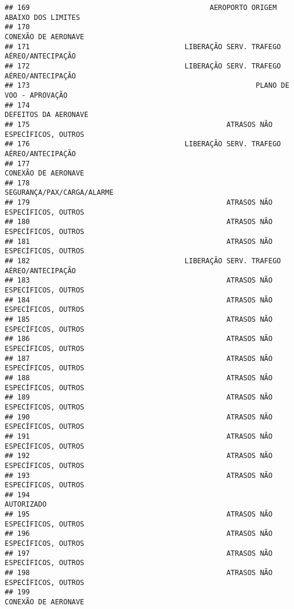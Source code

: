 \documentclass[
]{article}
\begin{document}
\begin{verbatim}
## 169                                           AEROPORTO ORIGEM ABAIXO DOS LIMITES
## 170                                                           CONEXÃO DE AERONAVE
## 171                                     LIBERAÇÃO SERV. TRAFEGO AÉREO/ANTECIPAÇÃO
## 172                                     LIBERAÇÃO SERV. TRAFEGO AÉREO/ANTECIPAÇÃO
## 173                                                      PLANO DE VOO - APROVAÇÃO
## 174                                                          DEFEITOS DA AERONAVE
## 175                                               ATRASOS NÃO ESPECÍFICOS, OUTROS
## 176                                     LIBERAÇÃO SERV. TRAFEGO AÉREO/ANTECIPAÇÃO
## 177                                                           CONEXÃO DE AERONAVE
## 178                                                    SEGURANÇA/PAX/CARGA/ALARME
## 179                                               ATRASOS NÃO ESPECÍFICOS, OUTROS
## 180                                               ATRASOS NÃO ESPECÍFICOS, OUTROS
## 181                                               ATRASOS NÃO ESPECÍFICOS, OUTROS
## 182                                     LIBERAÇÃO SERV. TRAFEGO AÉREO/ANTECIPAÇÃO
## 183                                               ATRASOS NÃO ESPECÍFICOS, OUTROS
## 184                                               ATRASOS NÃO ESPECÍFICOS, OUTROS
## 185                                               ATRASOS NÃO ESPECÍFICOS, OUTROS
## 186                                               ATRASOS NÃO ESPECÍFICOS, OUTROS
## 187                                               ATRASOS NÃO ESPECÍFICOS, OUTROS
## 188                                               ATRASOS NÃO ESPECÍFICOS, OUTROS
## 189                                               ATRASOS NÃO ESPECÍFICOS, OUTROS
## 190                                               ATRASOS NÃO ESPECÍFICOS, OUTROS
## 191                                               ATRASOS NÃO ESPECÍFICOS, OUTROS
## 192                                               ATRASOS NÃO ESPECÍFICOS, OUTROS
## 193                                               ATRASOS NÃO ESPECÍFICOS, OUTROS
## 194                                                                    AUTORIZADO
## 195                                               ATRASOS NÃO ESPECÍFICOS, OUTROS
## 196                                               ATRASOS NÃO ESPECÍFICOS, OUTROS
## 197                                               ATRASOS NÃO ESPECÍFICOS, OUTROS
## 198                                               ATRASOS NÃO ESPECÍFICOS, OUTROS
## 199                                                           CONEXÃO DE AERONAVE

\end{verbatim}
\end{document}
